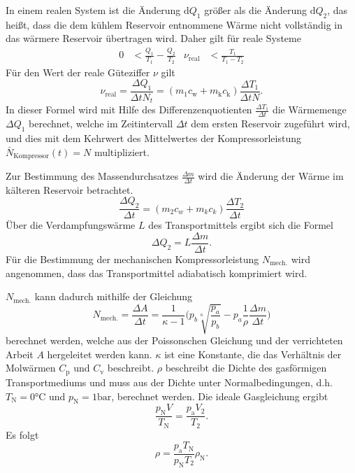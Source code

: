 In einem realen System ist die Änderung $\mathup{d}Q_1$ größer als die Änderung $\mathup{d}Q_2$, das heißt, dass die dem kühlem Reservoir entnommene Wärme nicht vollständig in das wärmere Reservoir übertragen wird.
Daher gilt für reale Systeme
\begin{align}
	 0 &< \frac{Q_1}{T_1}-\frac{Q_2}{T_2} & \nu_{\text{real}} &< \frac{T_1}{T_1-T_2}
\end{align}
Für den Wert der reale Güteziffer $\nu$ gilt
\begin{equation}
	\nu_\mathup{real}=\frac{\Delta{Q_1}}{{\Delta{t}}N_t}=(m_1c_\mathup{w}+m_\mathup{k}c_\mathup{k})\frac{\Delta{T_1}}{{\Delta{t}}N}.
	\label{waermemenge/zeitintervall}
\end{equation}
In dieser Formel wird mit Hilfe des Differenzenquotienten $\frac{\Delta{T_1}}{\Delta{t}}$ die Wärmemenge $\Delta{Q_1}$ berechnet, 
welche im Zeitintervall $\Delta{t}$ dem ersten Reservoir zugeführt wird, 
und dies mit dem Kehrwert des Mittelwertes der Kompressorleistung $\bar{N}_\text{Kompressor}(t) = N$ multipliziert.

Zur Bestimmung des Massendurchsatzes $\frac{\Delta{m}}{\Delta{t}}$ wird die Änderung der Wärme im kälteren Reservoir betrachtet.
\begin{equation}
	\frac{\Delta Q_2}{\Delta t} =(m_2 c_w + m_k c_k)\frac{\Delta T_2}{\Delta t}
\label{eq:q2-t-verhaeltnis}
\end{equation}
Über die Verdampfungswärme $L$ des Transportmittels ergibt sich die Formel
\begin{equation}
	\Delta Q_2 =L\frac{\Delta m} {\Delta t}.
\label{eq:verdampfungswaerme}	
\end{equation}
Für die Bestimmung der mechanischen Kompressorleistung $N_\text{mech.}$ wird angenommen, dass das Transportmittel adiabatisch komprimiert wird. 

$N_\text{mech.}$ kann dadurch mithilfe der Gleichung
\begin{equation}
	N_\mathup{mech.}=\frac{\Delta{A}}{\Delta{t}}=\frac{1}{\kappa-1}\biggl(p_b \sqrt[\kappa]{\frac{p_a}{p_b}}-p_a\frac{1}{\rho}\frac{\Delta{m}}{\Delta{t}}\biggr)
\label{eq:kompressorleistung}
\end{equation}
berechnet werden, welche aus der Poissonschen Gleichung und der verrichteten Arbeit $A$ hergeleitet werden kann. 
$\kappa$ ist eine Konstante, die das Verhältnis der Molwärmen $C_\mathup{p}$ und $C_\mathup{v}$ beschreibt. 
$\rho$ beschreibt die Dichte des gasförmigen Transportmediums und muss aus der Dichte unter Normalbedingungen, d.h. $T_\mathup{N}=0\si{\celsius}$ und $p_\mathup{N}=1\si{\bar}$, berechnet werden. 
Die ideale Gasgleichung ergibt
\begin{equation}
	\frac{p_\mathup{N} V}{T_\mathup{N}}=\frac{p_\mathup{a} V_2}{T_2}.
\end{equation}
Es folgt
\begin{equation}
	\rho=\frac{p_\mathup{a}T_\mathup{N}}{p_\mathup{N}T_2}\rho_\mathup{N}.
\label{eq:transportmediumdichte}
\end{equation}
